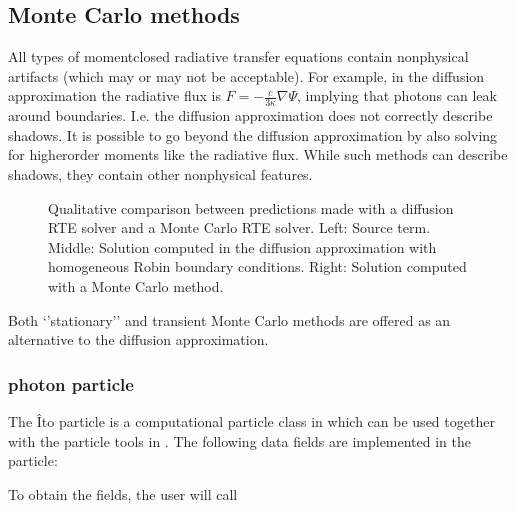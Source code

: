 \documentclass[letterpaper,10pt,english]{sphinxmanual}
\let\sphinxpxdimen\pdfpxdimen\else\newdimen\sphinxpxdimen
\begin{document}
\subsection{Monte Carlo methods}
\label{\detokenize{RTE:monte-carlo-methods}}
All types of moment\sphinxhyphen{}closed radiative transfer equations contain nonphysical artifacts (which may or may not be acceptable).
For example, in the diffusion approximation the radiative flux is \(F = -\frac{c}{3\kappa}\nabla \Psi\), implying that photons can leak around boundaries.
I.e. the diffusion approximation does not correctly describe shadows.
It is possible to go beyond the diffusion approximation by also solving for higher\sphinxhyphen{}order moments like the radiative flux.
While such methods can describe shadows, they contain other nonphysical features.

\begin{figure}[htb]
\centering
\capstart

\noindent\sphinxincludegraphics[width=720\sphinxpxdimen]{{rte_comp}.png}
\caption{Qualitative comparison between predictions made with a diffusion RTE solver and a Monte Carlo RTE solver.
Left: Source term.
Middle: Solution computed in the diffusion approximation with homogeneous Robin boundary conditions.
Right: Solution computed with a Monte Carlo method.}\label{\detokenize{RTE:id1}}\end{figure}

Both ‘’stationary’’ and transient Monte Carlo methods are offered as an alternative to the diffusion approximation.


\subsubsection{photon particle}
\label{\detokenize{RTE:photon-particle}}
The Îto particle is a computational particle class in  which can be used together with the particle tools in .
The following data fields are implemented in the particle:

\begin{sphinxVerbatim}[commandchars=\\\{\},formatcom=\scriptsize]
 
 
 
 
\end{sphinxVerbatim}

To obtain the fields, the user will call
\end{document}
